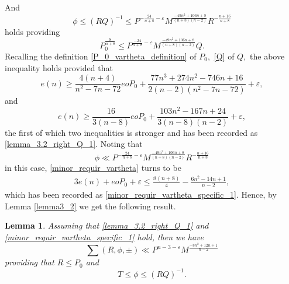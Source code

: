 \documentclass[12pt]{amsart}
\newtheorem{lemma}[theorem]{Lemma}
\theoremstyle{definition}
\numberwithin{equation}{section}
\begin{document}
And
\begin{equation*}
    \phi \leq (RQ)^{-1} \leq P^{-\frac{24}{n+8}-\varepsilon}M^{\frac{-49n^2+106n+8}{(n+8)(n-2)}}R^{-\frac{n+16}{n+8}}
\end{equation*}
holds providing
$$
P_0^{\frac{8}{n+8}} \leq P^{\frac{-24}{n+8}-\varepsilon}M^{\frac{-49n^2+106n+8}{(n+8)(n-2)}} Q.
$$
Recalling the definition \eqref{P_0_vartheta_definition} of $P_0,$ \eqref{Q} of $Q,$ the above inequality holds provided that 
\begin{equation*}  %
    e(n) \geq \frac{4(n+4)}{n^2-7n-72}eoP_0+\frac{77n^3+274n^2-746n+16}{2(n-2)(n^2-7n-72)}+\varepsilon,
\end{equation*}
and 
\begin{equation*}  %
    e(n) \geq \frac{16}{3(n-8)}eoP_0+\frac{103n^2-167n+24}{3(n-8)(n-2)}+\varepsilon,
\end{equation*}
the first of which two inequalities is stronger and has been recorded as \eqref{lemma_3.2_right_Q_1}.
Noting that
$$
\phi \ll P^{-\frac{24}{n+8}-\varepsilon}M^{\frac{-49n^2+106n+8}{(n+8)(n-2)}}R^{-\frac{n+16}{n+8}}
$$
in this case,
\eqref{minor_requir_vartheta} turns to be 
\begin{equation*}  %
\begin{split}
    3e(n)+eoP_0+\varepsilon \leq \frac{\vartheta(n+8)}{4}-\frac{6n^2-14n+1}{n-2} ,
\end{split}
\end{equation*}
which has been recorded as \eqref{minor_requir_vartheta_specific_1}.
Hence, by Lemma \ref{lemma3_2} we get the following result.

\begin{lemma} %
    \label{lemma_3_3}
    Assuming that 
    \eqref{lemma_3.2_right_Q_1}
    and \eqref{minor_requir_vartheta_specific_1}
       hold, then we have
\begin{equation*}
    \sum(R,\phi,\pm) \ll P^{n-3-\varepsilon}M^{\frac{-8n^2+12n+1}{n-2}}
\end{equation*}
providing that $R \leq P_0$ and 
\begin{equation*}
    T \leq \phi \leq (RQ)^{-1}.
\end{equation*}
\end{lemma}
\end{document}
